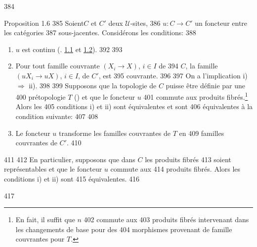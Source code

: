    384	\begin{enonce*}{Proposition 1.6}
   385	Soient\pageoriginale $C$ et $C'$ deux $𝒰$-sites,
   386	$u:C\rightarrow C'$ un foncteur entre les catégories
   387	sous-jacentes. Considérons les conditions:
   388	\begin{enumerate}
   389	\renewcommand{\theenumi}{\roman{enumi}}
   390	\renewcommand{\labelenumi}{\theenumi)}
   391	\item $u$ est continu {\rm(\cf. \hyperref[III.def1.1]{1.1} et \hyperref[III.prop1.2]{1.2}).}
   392	
   393	\item Pour tout famille couvrante $(X_i\rightarrow X)$, $i\in I$ de
   394	  $C$, la famille $(uX_i\rightarrow uX)$, $i\in I$, de $C'$, est
   395	  couvrante.
   396	
   397	On a l'implication {\rm i) $\Rightarrow$ ii).}
   398	
   399	Supposons que la topologie de $C$ puisse être définie par une
   400	prétopologie {\rm $T$ ()} et que le foncteur $u$
   401	commute aux produits fibrés.\footnote[1]{En fait, il suffit que $n$
   402	commute aux
   403	  produits fibrés intervenant dans les changements de base pour des
   404	  morphismes provenant de famille couvrantes pour $T$.} Alors les
   405	conditions {\rm i)} et {\rm ii)} sont équivalentes et sont
   406	équivalentes à la condition suivante:
   407	
   408	\item Le foncteur $u$ transforme les familles couvrantes de $T$ en
   409	  familles couvrantes de $C'$.
   410	\end{enumerate}
   411	
   412	En particulier, supposons que dans $C$ les produits fibrés
   413	soient représentables et que le foncteur $u$ commute aux
   414	produits fibrés. Alors les conditions {\rm i)} et {\rm ii)} sont
   415	équivalentes.
   416	\end{enonce*}
   417	
